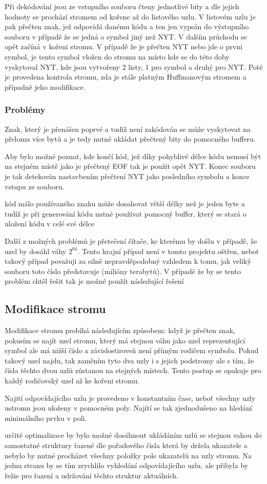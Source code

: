 \documentclass[12pt,a4paper,titlepage,final]{article}
\begin{document}
	Při dekódování jsou ze vstupního souboru čteny jednotlivé bity
	a dle jejich hodnoty se prochází stromem od kořene až do listového uzlu.
	V listovém uzlu je pak přečten znak, jež odpovídá danému kódu a ten jen vypsán do výstupního souboru
	v případě že se jedná o symbol jiný než NYT. V dalším průchodu se opět začíná v kořeni stromu.
	V případě že je přečten NYT nebo jde o první symbol, je tento symbol vložen do stromu na místo
	kde se do této doby vyskytoval NYT, kde jsou vytvořeny 2 listy, 1 pro symbol a druhý pro NYT.
	Poté je provedena kontrola stromu, zda je stále platným Huffmanovým stromem a případně jeho modifikace.

\subsubsection{Problémy}
	Znak, který je přenášen poprvé a tudíž není zakódován se může vyskytovat na přelomu více bytů a 
	je tedy nutné ukládat přečtený bity do pomocného bufferu.

	Aby bylo možné poznat, kde končí kód, jež díky pohyblivé délce kódu nemusí být na stejném místě jako je přečtený EOF
	tak je použit opět NYT. Konec souboru je tak detekován nastavbením přečtení NYT jako posledního symbolu
	a konce vstupu ze souboru.

	kód málo používaného znaku může dosahovat větší délky než je jeden byte a tudíž je při generování kódu nutné
	používat pomocný buffer, který se stará o uložení kódu v celé své délce

	Další z možných problémů je přetečení čítače, ke kterému by došlu v případě, že uzel by dosáhl váhy $2^{64}$.
	Tento krajní případ není v tomto projektu oštřen, nebot takový případ považuji za silně nepravděpodobný vzhledem k tomu,
	jak veliký souboru toto číslo představuje (milióny terabytů). V případě že by se tento problém chtěl řešit tak je možné použít následující
	řešení

\subsection{Modifikace stromu}
Modifikace stromu probíhá následujícím způsobem:
když je přečten znak, pokusím se najít uzel stromu, který má stejnou váhu jako uzel reprezentující symbol ale má nižší číslo a závislostiroveň 
není přímým rodičem symbolu. Pokud takový uzel najdu, tak zaměním tyto dva uzly i s jejich podstromy ale s tím, že čísla těchto dvou uzlů zůstanou 
na stejných místech. Tento postup se opakuje pro každý rodičovský uzel až ke kořeni stromu.

Najití odpovídajícího uzlu je provedeno v konstantním čase, neboť všechny uzly ustromu jsou uloženy v pomocném poly.
Najítí se tak zjednodušeno na hledání minimálního prvku v poli.

určité optimalizace by bylo možné dosáhnout ukládáním uzlů se stejnou vahou do samostatné struktury řazené dle pořadového čisla
která by držela ukazatele a nebylo by nutné procházet všechny položky pole ukazatelů na uzly stromu.
Na jednu stranu by se tím zrychlilo vyhledání odpovídajícího uzlu, ale přibyla by řežie pro řazení a udržování těchto struktur aktuálních.
\end{document}
